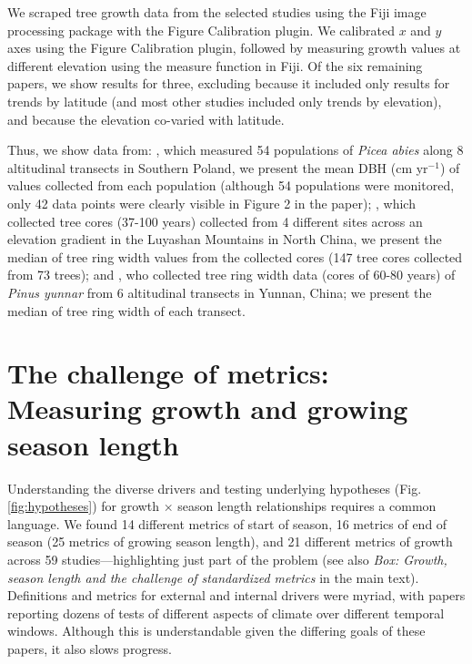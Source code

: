\documentclass[11pt]{article}
\begin{document}
We scraped tree growth data from the selected studies using the Fiji image processing package with the Figure Calibration plugin. We calibrated $x$ and $y$ axes using the Figure Calibration plugin, followed by measuring growth values at different elevation using the measure function in Fiji. Of the six remaining papers, we show results for three, excluding \cite{huang2010radial} because it included only results for trends by latitude (and most other studies included only trends by elevation), and \cite{cavin2017highest,zhu2018spatial} because the elevation co-varied with latitude. %

Thus, we show data from: \cite{oleksyn1998growth}, which measured 54 populations of  \emph{Picea abies} along 8 altitudinal transects in Southern Poland, we present the mean DBH (cm yr$^{-1}$) of values collected from each population (although 54 populations were monitored, only 42 data points were clearly visible in Figure 2 in the paper); \cite{wang2017climatic}, which collected  tree cores (37-100 years) collected from 4 different sites across an elevation gradient in the Luyashan Mountains in North China, we present the median of tree ring width values from the collected cores (147 tree cores collected from 73 trees); and \cite{zhou2022altitudinal}, who collected tree ring width data (cores of 60-80 years) of \emph{Pinus yunnar} from 6 altitudinal transects in Yunnan, China; we present the median of tree ring width of each transect.

\section*{The challenge of metrics: Measuring growth and growing season length}

Understanding the diverse drivers and testing underlying hypotheses (Fig. \ref{fig:hypotheses}) for growth $\times$ season length relationships requires a common language. We found 14 different metrics of start of season, 16 metrics of end of season (25 metrics of growing season length), and 21 different metrics of growth across 59 studies---highlighting just part of the problem (see also \emph{Box: Growth, season length and the challenge of standardized metrics} in the main text). Definitions and metrics for external and internal drivers were myriad, %
with papers reporting dozens of tests of different aspects of climate over different temporal windows. Although this is understandable given the differing goals of these papers, it also slows progress. 
\end{document}

